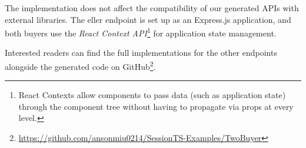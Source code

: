 The \newtheory implementation does not affect
the compatibility of our generated APIs with external libraries.
The eller endpoint is set up as an Express.js
application, and both buyers use the \textit{React Context API}\footnote{
React Contexts allow components
to pass data (such as application state)
through the component tree without
having to propagate via props at every level.
}
for application state management. 
%

Interested readers can find the full implementations for the other
endpoints alongside the generated code on
GitHub\footnote{
\url{https://github.com/ansonmiu0214/SessionTS-Examples/TwoBuyer}
}.
